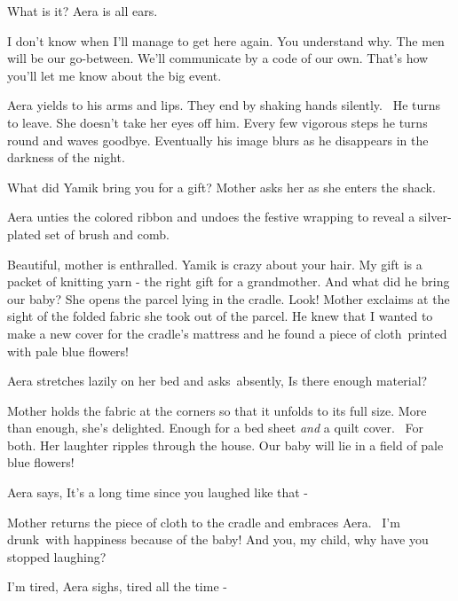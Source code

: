 \documentclass[letterpaper]{article}
\begin{document}
{\textquotedbl}What is it?{\textquotedbl} Aera is all ears.

{\textquotedbl}I don't know when I'll manage to get here again. You understand why. The men will be our go-between.
We'll communicate by a code of our own. That's how you'll let me know about the big event.{\textquotedbl} 

Aera yields to his arms and lips. They end by shaking hands silently. ~He turns to leave. She doesn't take her eyes off
him. Every few vigorous steps he turns round and waves goodbye. Eventually his image blurs as he disappears in the
darkness of the night. 

{\textquotedbl}What did Yamik bring you for a gift?{\textquotedbl} Mother asks her as she enters the shack. 

Aera unties the colored ribbon and undoes the festive wrapping to reveal a silver-plated set of brush and comb.\ 

{\textquotedbl}Beautiful,{\textquotedbl} mother is enthralled. {\textquotedbl}Yamik is crazy about your hair. My gift is
a packet of knitting yarn - the right gift for a grandmother. And what did he bring our baby?{\textquotedbl} She opens
the parcel lying in the cradle. {\textquotedbl}Look!{\textquotedbl} Mother exclaims at the sight of the folded fabric
she took out of the parcel. {\textquotedbl}He knew that I wanted to make a new cover for the cradle's mattress and he
found a piece of cloth\ printed with pale blue flowers!{\textquotedbl} 

Aera stretches lazily on her bed and asks~absently, {\textquotedbl}Is there enough material?{\textquotedbl}

Mother holds the fabric at the corners so that it unfolds to its full size. {\textquotedbl}More than
enough,{\textquotedbl} she's delighted. {\textquotedbl}Enough for a bed sheet \textit{and }a quilt cover. \ For
both.{\textquotedbl} Her laughter ripples through the house. {\textquotedbl}Our baby will lie in a field of pale blue
flowers!{\textquotedbl} 

Aera says, {\textquotedbl}It's a long time since you laughed like that -{\textquotedbl} 

Mother returns the piece of cloth to the cradle and embraces Aera. ~{\textquotedbl}I'm drunk~with happiness because of
the baby! And you, my child, why have you stopped laughing?{\textquotedbl} 

{\textquotedbl}I'm tired,{\textquotedbl} Aera sighs, {\textquotedbl}tired all the time -{\textquotedbl} 
\end{document}
